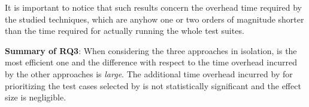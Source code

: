 It is important to notice that such results concern the overhead time required by the studied techniques, which are anyhow one or two orders of magnitude shorter than the time required for actually running the whole test suites.

\begin{tcolorbox}%
\textbf{Summary of RQ3}: When considering the three approaches in isolation, \fs is the most efficient one and the difference with respect to the time overhead incurred by the other approaches is \textit{large}.
The additional time overhead incurred by \fz for prioritizing the test cases selected by \ek is not statistically significant and the effect size is negligible.
\end{tcolorbox}